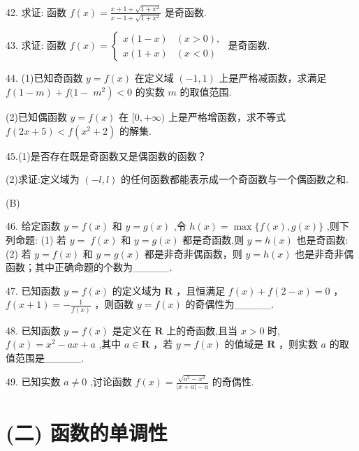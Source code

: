 \documentclass[10pt]{article}
\begin{document}
42. 求证: 函数 \(f\left( x\right)  = \frac{x + 1 + \sqrt{1 + {x}^{2}}}{x - 1 + \sqrt{1 + {x}^{2}}}\) 是奇函数.

43. 求证: 函数 \(f\left( x\right)  = \left\{  \begin{array}{ll} x\left( {1 - x}\right) & \left( {x > 0}\right) , \\  x\left( {1 + x}\right) & \left( {x < 0}\right)  \end{array}\right.\) 是奇函数.

44. (1)已知奇函数 \(y = f\left( x\right)\) 在定义域 \(\left( {-1,1}\right)\) 上是严格减函数，求满足 \(f\left( {1 - m}\right)  + f(1 - \; \left. {m}^{2}\right)  < 0\) 的实数 \(m\) 的取值范围.

(2)已知偶函数 \(y = f\left( x\right)\) 在 \(\lbrack 0, + \infty )\) 上是严格增函数，求不等式 \(f\left( {{2x} + 5}\right)  < f\left( {{x}^{2} + 2}\right)\) 的解集.

45.(1)是否存在既是奇函数又是偶函数的函数？

(2)求证:定义域为 \(\left( {-l,l}\right)\) 的任何函数都能表示成一个奇函数与一个偶函数之和.

(B)

46. 给定函数 \(y = f\left( x\right)\) 和 \(y = g\left( x\right)\) ,令 \(h\left( x\right)  = \max \{ f\left( x\right) ,g\left( x\right) \}\) ,则下列命题: (1) 若 \(y = \; f\left( x\right)\) 和 \(y = g\left( x\right)\) 都是奇函数,则 \(y = h\left( x\right)\) 也是奇函数:(2) 若 \(y = f\left( x\right)\) 和 \(y = g\left( x\right)\) 都是非奇非偶函数，则 \(y = h\left( x\right)\) 也是非奇非偶函数；其中正确命题的个数为\_\_\_\_\_.

47. 已知函数 \(y = f\left( x\right)\) 的定义域为 \(\mathbf{R}\) ，且恒满足 \(f\left( x\right)  + f\left( {2 - x}\right)  = 0\) ， \(f\left( {x + 1}\right)  =  - \frac{1}{f\left( x\right) }\) ，则函数 \(y = f\left( x\right)\) 的奇偶性为\_\_\_\_\_.

48. 已知函数 \(y = f\left( x\right)\) 是定义在 \(\mathbf{R}\) 上的奇函数,且当 \(x > 0\) 时, \(f\left( x\right)  = {x}^{2} - {ax} + a\) ,其中 \(a \in  \mathbf{R}\) ，若 \(y = f\left( x\right)\) 的值域是 \(\mathbf{R}\) ，则实数 \(a\) 的取值范围是\_\_\_\_\_.

49. 已知实数 \(a \neq  0\) ,讨论函数 \(f\left( x\right)  = \frac{\sqrt{{a}^{2} - {x}^{2}}}{\left| {x + a}\right|  - a}\) 的奇偶性.

\section*{(二) 函数的单调性}
\end{document}
